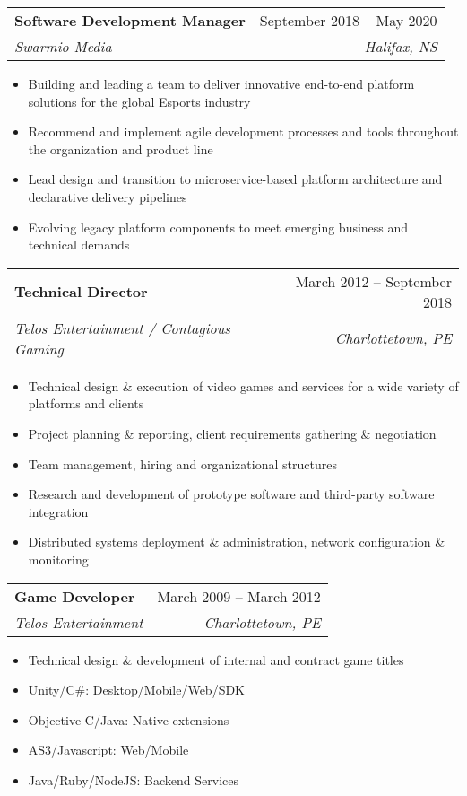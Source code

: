 \documentclass[letterpaper,11pt]{article}
\makeatletter
\newcommand{\resumeItemListStart}{\begin{itemize}[leftmargin=15pt, label={}]}
\newcommand{\resumeItemListEnd}{\end{itemize}\vspace{-5pt}}
\newcommand{\resumeItem}[2]{
  \item[#1]\small{
    {#2 \vspace{-2pt}}
  }
}
\newcommand{\resumeSubheading}[4]{
  \vspace{-2pt}\item
    \begin{tabular*}{0.97\textwidth}[t]{l@{\extracolsep{\fill}}r}
      \textbf{#1} & #2 \\
      \textit{\small#3} & \textit{\small #4} \\
    \end{tabular*}\vspace{-7pt}
}
\newcommand{\resumeSubSubheading}[2]{
    \item
    \begin{tabular*}{0.97\textwidth}{l@{\extracolsep{\fill}}r}
      \textit{\small#1} & \textit{\small #2} \\
    \end{tabular*}\vspace{-7pt}
}
\makeatother
\begin{document}
\resumeSubheading
{Software Development Manager}{September 2018 -- May 2020}
{Swarmio Media}{Halifax, NS}
\resumeItemListStart
\resumeItem{\faCircle}{Building and leading a team to deliver innovative end-to-end platform solutions for the global Esports industry}
\resumeItem{\faCircle}{Recommend and implement agile development processes and tools throughout the organization and product line}
\resumeItem{\faCircle}{Lead design and transition to microservice-based platform architecture and declarative delivery pipelines}
\resumeItem{\faCircle}{Evolving legacy platform components to meet emerging business and technical demands}

\resumeItemListEnd


\resumeSubheading
{Technical Director}{March 2012 -- September 2018}
{Telos Entertainment / Contagious Gaming}{Charlottetown, PE}
\resumeItemListStart
\resumeItem{\faCircle}{Technical design \& execution of video games and services for a wide variety of platforms and clients}
\resumeItem{\faCircle}{Project planning \& reporting, client requirements gathering \& negotiation}
\resumeItem{\faCircle}{Team management, hiring and organizational structures}
\resumeItem{\faCircle}{Research and development of prototype software and third-party software integration}
\resumeItem{\faCircle}{Distributed systems deployment \& administration, network configuration \& monitoring}

\resumeItemListEnd

\resumeSubheading
{Game Developer}{March 2009 -- March 2012}
{Telos Entertainment}{Charlottetown, PE}
\resumeItemListStart
\resumeItem{\faCircle}{Technical design \& development of internal and contract game titles}
\resumeItem{\faCircle}{Unity/C\#: Desktop/Mobile/Web/SDK}
\resumeItem{\faCircle}{Objective-C/Java: Native extensions}
\resumeItem{\faCircle}{AS3/Javascript: Web/Mobile}
\resumeItem{\faCircle}{Java/Ruby/NodeJS: Backend Services}
\resumeItemListEnd

\end{document}
